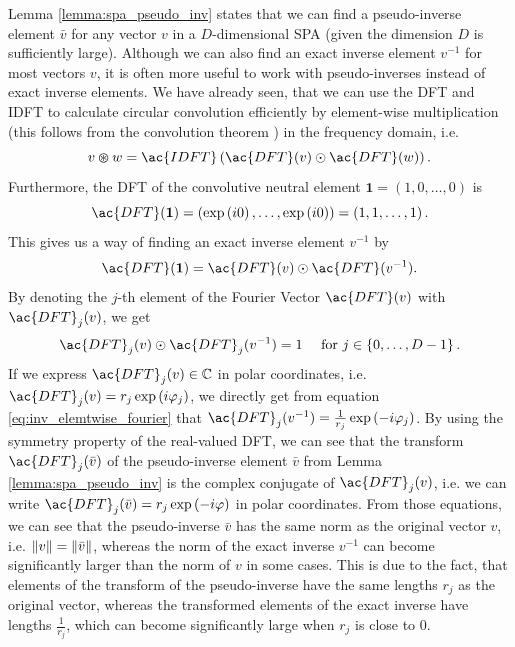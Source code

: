 Lemma \ref{lemma:spa_pseudo_inv} states that we can find a pseudo-inverse element $\bar{v}$ for any vector $v$ in a $D$-dimensional \ac{SPA} (given the dimension $D$ is sufficiently large).
Although we can also find an exact inverse element $v^{-1}$ for most vectors $v$, it is often more useful to work with pseudo-inverses instead of exact inverse elements.
We have already seen, that we can use the \acf{DFT} and \acf{IDFT} to calculate circular convolution efficiently by element-wise multiplication (this follows from the convolution theorem \cite[Chap. 6]{Bracewell2000}) in the frequency domain, i.e.
\[
	v \varoast w = \ac{IDFT}\left(\ac{DFT}(v) \odot \ac{DFT}(w) \right).
\]
Furthermore, the \ac{DFT} of the convolutive neutral element $\mathbf{1} = \left(1, 0, \ldots, 0\right)$ is
\begin{equation}
	\ac{DFT}(\mathbf{1}) = \left(\exp\left(i0\right), \ldots, \exp\left(i0\right)\right) = \left(1, 1, \ldots, 1\right).
\end{equation}
This gives us a way of finding an exact inverse element $v^{-1}$ by
\begin{equation}
	\ac{DFT}(\mathbf{1}) = \ac{DFT}(v) \odot \ac{DFT}(v^{-1}).
\end{equation}
By denoting the $j$-th element of the Fourier Vector $\ac{DFT}(v)$ with $\ac{DFT}_{j}(v)$, we get
\begin{equation}
\label{eq:inv_elemtwise_fourier}
	\ac{DFT}_{j}(v) \odot \ac{DFT}_{j}(v^{-1}) = 1 \quad \textrm{ for } j \in \left\{0, \ldots, D-1\right\}.
\end{equation}
If we express $\ac{DFT}_{j}(v) \in \mathbb{C}$ in polar coordinates, i.e. $\ac{DFT}_{j}(v) = r_j \exp\left(i\varphi_j\right)$, we directly get from equation \ref{eq:inv_elemtwise_fourier} that $\ac{DFT}_{j}(v^{-1}) = \frac{1}{r_j} \exp\left(-i\varphi_j\right)$.
By using the symmetry property of the real-valued \ac{DFT}, we can see that the transform $\ac{DFT}_j(\bar{v})$ of the pseudo-inverse element $\bar{v}$ from Lemma \ref{lemma:spa_pseudo_inv} is the complex conjugate of $\ac{DFT}_j(v)$, i.e. we can write $\ac{DFT}_j(\bar{v}) = r_j \exp\left(-i\varphi\right)$ in polar coordinates.
From those equations, we can see that the pseudo-inverse $\bar{v}$ has the same norm as the original vector $v$, i.e. $\left\| v \right\| = \left\| \bar{v} \right\|$, whereas the norm of the exact inverse $v^{-1}$ can become significantly larger than the norm of $v$ in some cases.
This is due to the fact, that elements of the transform of the pseudo-inverse have the same lengths $r_j$ as the original vector, whereas the transformed elements of the exact inverse have lengths $\frac{1}{r_j}$, which can become significantly large when $r_j$ is close to $0$.
